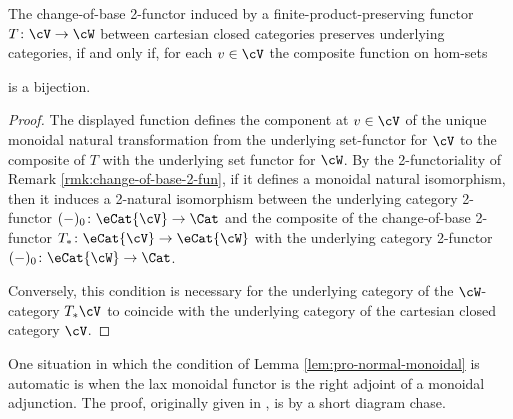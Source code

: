 \begin{lemma}\label{lem:pro-normal-monoidal} The change-of-base 2-functor induced by a finite-product-preserving functor $T \colon \cV \to \cW$ between cartesian closed categories preserves underlying categories, if and only if, for each $v \in \cV$ the composite function on hom-sets
\begin{center}
\end{center} is a bijection.
\end{lemma}
\begin{proof}
The displayed function defines the component at $v \in \cV$ of the unique monoidal natural transformation from the underlying set-functor for $\cV$ to the composite of $T$ with the underlying set functor for $\cW$. By the 2-functoriality of Remark \ref{rmk:change-of-base-2-fun}, if it defines a monoidal natural isomorphism, then it induces a 2-natural isomorphism between the underlying category 2-functor $(-)_0 \colon \eCat{\cV} \to \Cat$ and the composite of the change-of-base 2-functor $T_* \colon \eCat{\cV} \to\eCat{\cW}$ with the underlying category 2-functor $(-)_0 \colon \eCat{\cW} \to \Cat$.

Conversely, this condition is necessary for the underlying category of the $\cW$-category $T_*\cV$ to coincide with the underlying category of the cartesian closed category $\cV$.
\end{proof}

One situation in which the condition of Lemma \ref{lem:pro-normal-monoidal} is automatic is when the lax monoidal functor is the right adjoint of a monoidal adjunction. The proof, originally given in \cite{Kelly:1974da}, is by a short diagram chase.


